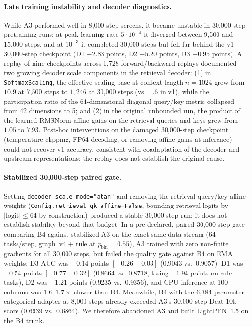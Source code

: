 \documentclass[11pt]{article}
\begin{document}
\paragraph{Late training instability and decoder diagnostics.}
While A3 performed well in 8,000-step screens, it became unstable in 30,000-step pretraining runs: at peak learning rate $5\cdot 10^{-4}$ it diverged between 9,500 and 15,000 steps, and at $10^{-3}$ it completed 30,000 steps but fell far behind the v1 30,000-step checkpoint (D1 $-2.83$ points, D2 $-5.20$ points, D3 $-0.95$ points). %
A replay of nine checkpoints across 1,728 forward/backward replays documented two growing decoder scale components in the retrieval decoder: %
(1) in \texttt{SoftmaxScaling}, the effective scaling base at context length $n=1024$ grew from $10.9$ at 7,500 steps to $1{,}246$ at 30,000 steps (vs.\ $1.6$ in v1), while the participation ratio of the 64-dimensional diagonal query/key metric collapsed from 42 dimensions to 5; %
and (2) in the original unbounded run, the product of the learned RMSNorm affine gains on the retrieval queries and keys grew from $1.05$ to $7.93$. %
Post-hoc interventions on the damaged 30,000-step checkpoint (temperature clipping, FP64 decoding, or removing affine gains at inference) could not recover v1 accuracy, consistent with coadaptation of the decoder and upstream representations; the replay does not establish the original cause. %

\paragraph{Stabilized 30,000-step paired gate.}
Setting \texttt{decoder\_scale\_mode="atan"} and removing the retrieval query/key affine weights (\texttt{Config.retrieval\_qk\_affine=False}, bounding retrieval logits by $|\text{logit}| \le 64$ by construction) produced a stable 30,000-step run; it does not establish stability beyond that budget.
In a pre-declared, paired 30,000-step gate comparing B4 against stabilized A3 on the exact same data stream (64 tasks/step, graph~v4 + rule at $p_{\mathrm{bin}}=0.55$), A3 trained with zero non-finite gradients for all 30,000 steps, but failed the quality gate against B4 on EMA weights: D3 AUC was $-0.14$ points $[-0.26, -0.03]$ (0.9043 vs.\ 0.9057), D1 was $-0.54$ points $[-0.77, -0.32]$ (0.8664 vs.\ 0.8718, losing $-1.94$ points on rule tasks), D2 was $-1.21$ points (0.9235 vs.\ 0.9356), and CPU inference at 100 columns was $1.6\text{--}1.7\times$ slower than B4. %
Meanwhile, B4 with the 6,384-parameter categorical adapter at 8,000 steps already exceeded A3's 30,000-step Dcat 10k score (0.6939 vs.\ 0.6864). %
We therefore abandoned A3 and built LightPFN~1.5 on the B4 trunk.
\end{document}
